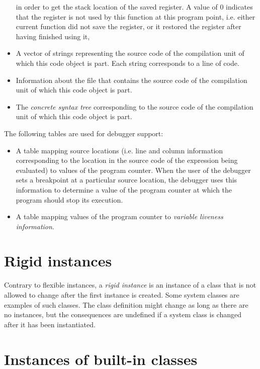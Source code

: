 \begin{itemize}
  in order to get the stack location of the saved register.  A value
  of $0$ indicates that the register is not used by this function at
  this program point, i.e. either current function did not save the
  register, or it restored the register after having finished using
  it,
\item A vector of strings representing the source code of the
  compilation unit of which this code object is part.  Each string
  corresponds to a line of code.
\item Information about the file that contains the source code of the
  compilation unit of which this code object is part.
\item The \emph{concrete syntax tree} corresponding to the source code
  of the compilation unit of which this code object is part.
\end{itemize}

The following tables are used for debugger support:

\begin{itemize}
\item A table mapping source locations (i.e. line and column
  information corresponding to the location in the source code of the
  expression being evaluated) to values of the program counter.  When
  the user of the debugger sets a breakpoint at a particular source
  location, the debugger uses this information to determine a value of
  the program counter at which the program should stop its execution.
\item A table mapping values of the program counter to \emph{variable
  liveness information}.
\end{itemize}

\section{Rigid instances}
\label{sec-data-representation-rigid-instances}

Contrary to flexible instances, a \emph{rigid instance} is an instance
of a class that is not allowed to change after the first instance is
created.  Some system classes are examples of such classes.  The class
definition might change as long as there are no instances, but the
consequences are undefined if a system class is changed after it has
been instantiated.

\section{Instances of built-in classes}

